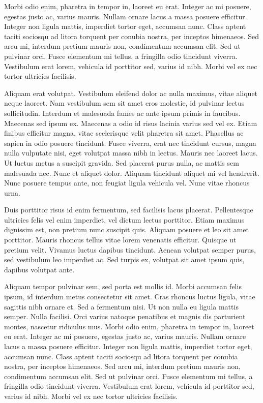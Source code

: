 \documentclass[twocolumn]{article}
\begin{document}
	Morbi odio enim, pharetra in tempor in, laoreet eu erat. Integer ac mi posuere, egestas justo ac, varius mauris. Nullam ornare lacus a massa posuere efficitur. Integer non ligula mattis, imperdiet tortor eget, accumsan nunc. Class aptent taciti sociosqu ad litora torquent per conubia nostra, per inceptos himenaeos. Sed arcu mi, interdum pretium mauris non, condimentum accumsan elit. Sed ut pulvinar orci. Fusce elementum mi tellus, a fringilla odio tincidunt viverra. Vestibulum erat lorem, vehicula id porttitor sed, varius id nibh. Morbi vel ex nec tortor ultricies facilisis.
	
	Aliquam erat volutpat. Vestibulum eleifend dolor ac nulla maximus, vitae aliquet neque laoreet. Nam vestibulum sem sit amet eros molestie, id pulvinar lectus sollicitudin. Interdum et malesuada fames ac ante ipsum primis in faucibus. Maecenas sed ipsum ex. Maecenas a odio id risus lacinia varius sed vel ex. Etiam finibus efficitur magna, vitae scelerisque velit pharetra sit amet. Phasellus ac sapien in odio posuere tincidunt. Fusce viverra, erat nec tincidunt cursus, magna nulla vulputate nisi, eget volutpat massa nibh in lectus. Mauris nec laoreet lacus. Ut luctus metus a suscipit gravida. Sed placerat purus nulla, ac mattis sem malesuada nec. Nunc et aliquet dolor. Aliquam tincidunt aliquet mi vel hendrerit. Nunc posuere tempus ante, non feugiat ligula vehicula vel. Nunc vitae rhoncus urna.
	
	Duis porttitor risus id enim fermentum, sed facilisis lacus placerat. Pellentesque ultricies felis vel enim imperdiet, vel dictum lectus porttitor. Etiam maximus dignissim est, non pretium nunc suscipit quis. Aliquam posuere et leo sit amet porttitor. Mauris rhoncus tellus vitae lorem venenatis efficitur. Quisque ut pretium velit. Vivamus luctus dapibus tincidunt. Aenean volutpat semper purus, sed vestibulum leo imperdiet ac. Sed turpis ex, volutpat sit amet ipsum quis, dapibus volutpat ante.
	
	Aliquam tempor pulvinar sem, sed porta est mollis id. Morbi accumsan felis ipsum, id interdum metus consectetur sit amet. Cras rhoncus luctus ligula, vitae sagittis nibh ornare et. Sed a fermentum nisi. Ut non nulla eu ligula mattis semper. Nulla facilisi. Orci varius natoque penatibus et magnis dis parturient montes, nascetur ridiculus mus.
	Morbi odio enim, pharetra in tempor in, laoreet eu erat. Integer ac mi posuere, egestas justo ac, varius mauris. Nullam ornare lacus a massa posuere efficitur. Integer non ligula mattis, imperdiet tortor eget, accumsan nunc. Class aptent taciti sociosqu ad litora torquent per conubia nostra, per inceptos himenaeos. Sed arcu mi, interdum pretium mauris non, condimentum accumsan elit. Sed ut pulvinar orci. Fusce elementum mi tellus, a fringilla odio tincidunt viverra. Vestibulum erat lorem, vehicula id porttitor sed, varius id nibh. Morbi vel ex nec tortor ultricies facilisis.
	
\end{document}
